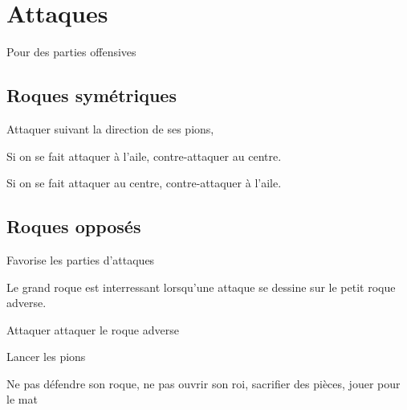 

%

\section{Attaques}
%
Pour des parties offensives
\subsection{Roques symétriques}
%
Attaquer suivant la direction de ses pions,

Si on se fait attaquer à l'aile, contre-attaquer au centre.

Si on se fait attaquer au centre, contre-attaquer à l'aile.
\subsection{Roques opposés}
%
Favorise les parties d'attaques

Le grand roque est interressant lorsqu'une attaque se dessine sur le petit roque adverse.

Attaquer attaquer le roque adverse


Lancer les pions



Ne pas défendre son roque, ne pas ouvrir son roi, sacrifier des pièces, jouer pour le mat


